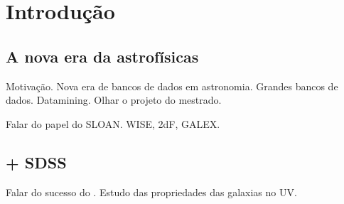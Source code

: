 


\chapter{Introdução}
\label{sec:Intro}


\section{A nova era da astrofísicas}
Motivação.
Nova era de bancos de dados em astronomia. Grandes bancos de dados. Datamining.
Olhar o projeto do mestrado.

Falar do papel do SLOAN. WISE, 2dF, GALEX.


\section{\starlight + SDSS}
\label{sec:Intro:Starlight}

Falar do sucesso do \starlight. Estudo das propriedades das galaxias
no UV.



